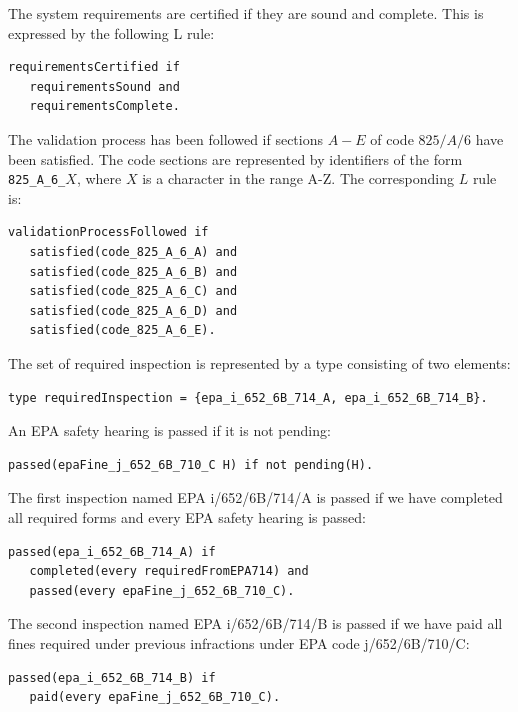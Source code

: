 \documentclass[a4paper,10pt]{article}
\begin{document}

\medskip\noindent
The system requirements are certified if they are sound and complete. This is expressed by the following L rule:

\begin{verbatim}
requirementsCertified if
   requirementsSound and
   requirementsComplete.
\end{verbatim}

\medskip\noindent
The validation process has been followed if sections $A-E$ of code  $825/A/6$ have been satisfied. The code sections are represented by identifiers of the form \texttt{825\_A\_6\_}$X$, where $X$ is a character in the range A-Z. The corresponding $L$ rule is:

\begin{verbatim}
validationProcessFollowed if
   satisfied(code_825_A_6_A) and
   satisfied(code_825_A_6_B) and
   satisfied(code_825_A_6_C) and
   satisfied(code_825_A_6_D) and
   satisfied(code_825_A_6_E).
\end{verbatim}


\medskip\noindent
The set of required inspection is represented by a type consisting of two elements:
\begin{verbatim}
type requiredInspection = {epa_i_652_6B_714_A, epa_i_652_6B_714_B}.
\end{verbatim} 

An EPA safety hearing is passed if it is not pending:
\begin{verbatim}
passed(epaFine_j_652_6B_710_C H) if not pending(H).
\end{verbatim}
 
\medskip\noindent
The first inspection named EPA i/652/6B/714/A is  passed if we have completed all 
   required forms and every EPA safety hearing is passed:

\begin{verbatim}
passed(epa_i_652_6B_714_A) if
   completed(every requiredFromEPA714) and
   passed(every epaFine_j_652_6B_710_C).
\end{verbatim}

\medskip\noindent
The second inspection named  EPA i/652/6B/714/B is passed if we have paid all fines 
required under previous infractions under EPA code j/652/6B/710/C:

\begin{verbatim}
passed(epa_i_652_6B_714_B) if
   paid(every epaFine_j_652_6B_710_C).
\end{verbatim}
\end{document}
